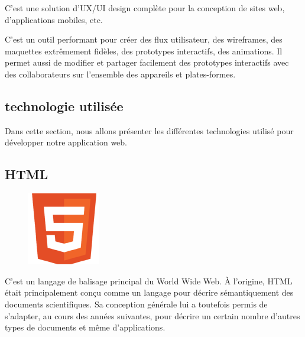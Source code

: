 C’est une solution d’UX/UI design complète pour la conception de sites web, 
d’applications mobiles, etc.

C’est un outil performant pour créer des flux utilisateur, des wireframes, des 
maquettes extrêmement fidèles, des prototypes interactifs, des animations. Il permet 
aussi de modifier et partager facilement des prototypes interactifs avec des 
collaborateurs sur l’ensemble des appareils et plates-formes\cite{45}.

        

\subsection{technologie utilisée}
Dans cette section, nous allons présenter les différentes technologies  utilisé 
pour développer notre application web.
    
\subsection{HTML}
    \begin{figure}
        \vspace{-22pt}
        \begin{center}
            \includegraphics[scale=0.36]{images/logo/html.png}
            \label{fig70}
        \end{center}
        \vspace{-20pt}
        \vspace{-10pt}
    \end{figure}

C'est un langage de balisage principal du World Wide Web. À l'origine, HTML 
était principalement conçu comme un langage pour décrire sémantiquement des 
documents scientifiques. Sa conception générale lui a toutefois permis de 
s’adapter, au cours des années suivantes, pour décrire un certain nombre 
d’autres types de documents et même d’applications\cite{14}.
    
